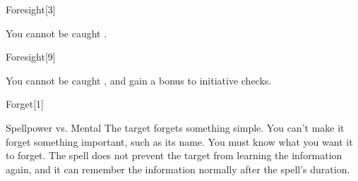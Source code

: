 \begin{spellsection}{Foresight}[3]
    \begin{spellheader}
    \end{spellheader}
    \begin{spellcontent}
        \begin{spelleffects}
            \spelleffect You cannot be caught \unaware.
            \spelldur \durlong
        \end{spelleffects}
    \end{spellcontent}
    \begin{spellfooter}
        \miscastexplode
    \end{spellfooter}
\end{spellsection}

\begin{spellsection}[Greater]{Foresight}[9]
    \begin{spellheader}
    \end{spellheader}
    \begin{spellcontent}
        \begin{spelleffects}
            \spelleffect You cannot be caught \unaware, and gain a  bonus to initiative checks.
            \spelldur \durlong
        \end{spelleffects}
    \end{spellcontent}
    \begin{spellfooter}
        \miscastexplode
    \end{spellfooter}
\end{spellsection}

\begin{spellsection}{Forget}[1]
    \begin{spellheader}
    \end{spellheader}
    \begin{spellcontent}
        \begin{spelltargetinginfo}
        \end{spelltargetinginfo}
        \begin{spelleffects}
            \begin{spellattack}{Spellpower vs. Mental}
                \spelleffect The target forgets something simple. You can't make it forget something important, such as its name. You must know what you want it to forget. The spell does not prevent the target from learning the information again, and it can remember the information normally after the spell's duration.
            \end{spellattack}
            \spelldur \durlong
        \end{spelleffects}
    \end{spellcontent}
    \begin{spellfooter}
        \miscastrandom
    \end{spellfooter}
\end{spellsection}

